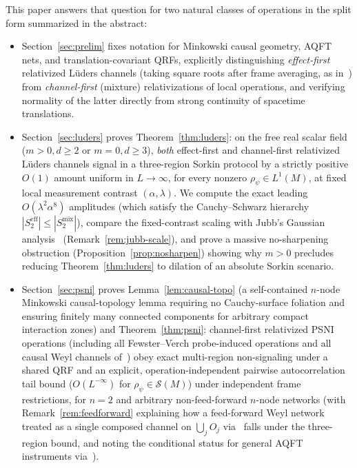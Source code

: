 \documentclass[11pt,a4paper]{article}
\theoremstyle{definition}
\theoremstyle{remark}
\begin{document}
This paper answers that question for two natural classes of operations in the split form summarized in the abstract:
\begin{itemize}[leftmargin=*,nosep]
\item Section~\ref{sec:prelim} fixes notation for Minkowski causal geometry, AQFT nets, and translation-covariant QRFs, explicitly distinguishing \emph{effect-first} relativized L\"uders channels (taking square roots after frame averaging, as in~\cite[Cor.~4.7]{FewsterLoveridge2026}) from \emph{channel-first} (mixture) relativizations of local operations, and verifying normality of the latter directly from strong continuity of spacetime translations.
\item Section~\ref{sec:luders} proves Theorem~\ref{thm:luders}: on the free real scalar field ($m>0, d\ge 2$ or $m=0, d\ge 3$), \emph{both} effect-first and channel-first relativized L\"uders channels signal in a three-region Sorkin protocol by a strictly positive $O(1)$ amount uniform in $L\to\infty$, for every nonzero $\rho_\psi\in L^1(M)$, at fixed local measurement contrast $(\alpha,\lambda)$. We compute the exact leading $O(\lambda^2\alpha^8)$ amplitudes (which satisfy the Cauchy--Schwarz hierarchy $|S_2^{\mathrm{eff}}|\le |S_2^{\mathrm{mix}}|$), compare the fixed-contrast scaling with Jubb's Gaussian analysis~\cite[Sec.~IV.D]{Jubb2022} (Remark~\ref{rem:jubb-scale}), and prove a massive no-sharpening obstruction (Proposition~\ref{prop:nosharpen}) showing why $m>0$ precludes reducing Theorem~\ref{thm:luders} to dilation of an absolute Sorkin scenario.
\item Section~\ref{sec:psni} proves Lemma~\ref{lem:causal-topo} (a self-contained $n$-node Minkowski causal-topology lemma requiring no Cauchy-surface foliation and ensuring finitely many connected components for arbitrary compact interaction zones) and Theorem~\ref{thm:psni}: channel-first relativized PSNI operations (including all Fewster--Verch probe-induced operations and all causal Weyl channels of~\cite{Mandrysch2026}) obey exact multi-region non-signaling under a shared QRF and an explicit, operation-independent pairwise autocorrelation tail bound ($O(L^{-\infty})$ for $\rho_\psi\in\mathcal{S}(M)$) under independent frame restrictions, for $n=2$ and arbitrary non-feed-forward $n$-node networks (with Remark~\ref{rem:feedforward} explaining how a feed-forward Weyl network treated as a single composed channel on $\bigcup_j O_j$ via~\cite[Thm.~20]{Mandrysch2026} falls under the three-region bound, and noting the conditional status for general AQFT instruments via~\cite[App.~F]{Mandrysch2026}).

\end{itemize}
\end{document}
